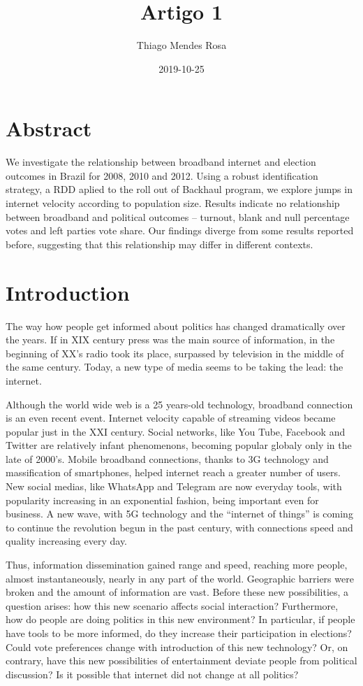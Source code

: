 \documentclass[12pt,]{article}
\title{Artigo 1}
\author{Thiago Mendes Rosa}
\date{2019-10-25}
\begin{document}
\maketitle

\hypertarget{abstract}{%
\section{Abstract}\label{abstract}}

We investigate the relationship between broadband internet and election
outcomes in Brazil for 2008, 2010 and 2012. Using a robust
identification strategy, a RDD aplied to the roll out of Backhaul
program, we explore jumps in internet velocity according to population
size. Results indicate no relationship between broadband and political
outcomes -- turnout, blank and null percentage votes and left parties
vote share. Our findings diverge from some results reported before,
suggesting that this relationship may differ in different contexts.

\hypertarget{introduction}{%
\section{Introduction}\label{introduction}}

The way how people get informed about politics has changed dramatically
over the years. If in XIX century press was the main source of
information, in the beginning of XX's radio took its place, surpassed by
television in the middle of the same century. Today, a new type of media
seems to be taking the lead: the internet.

Although the world wide web is a 25 years-old technology, broadband
connection is an even recent event. Internet velocity capable of
streaming videos became popular just in the XXI century. Social
networks, like You Tube, Facebook and Twitter are relatively infant
phenomenons, becoming popular globaly only in the late of 2000's. Mobile
broadband connections, thanks to 3G technology and massification of
smartphones, helped internet reach a greater number of users. New social
medias, like WhatsApp and Telegram are now everyday tools, with
popularity increasing in an exponential fashion, being important even
for business. A new wave, with 5G technology and the ``internet of
things'' is coming to continue the revolution begun in the past century,
with connections speed and quality increasing every day.

Thus, information dissemination gained range and speed, reaching more
people, almost instantaneously, nearly in any part of the world.
Geographic barriers were broken and the amount of information are vast.
Before these new possibilities, a question arises: how this new scenario
affects social interaction? Furthermore, how do people are doing
politics in this new environment? In particular, if people have tools to
be more informed, do they increase their participation in elections?
Could vote preferences change with introduction of this new technology?
Or, on contrary, have this new possibilities of entertainment deviate
people from political discussion? Is it possible that internet did not
change at all politics?
\end{document}

